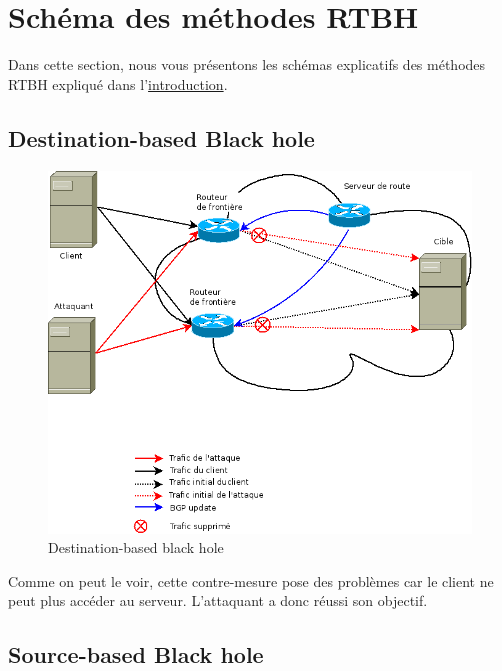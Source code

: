 \section{Schéma des méthodes RTBH}

Dans cette section, nous vous présentons les schémas explicatifs des méthodes RTBH expliqué dans l'\hyperref[sec:intro]{introduction}.

\newpage

\subsection{Destination-based Black hole}

\begin{figure}[H]
    \includegraphics[width=\textwidth]{./medias/schema_destination_based.png}
    \caption{Destination-based black hole}
    \label{fig:destination_based}
\end{figure}

Comme on peut le voir, cette contre-mesure pose des problèmes car le client ne peut plus accéder au serveur. L'attaquant a donc réussi son objectif.

\subsection{Source-based Black hole}

